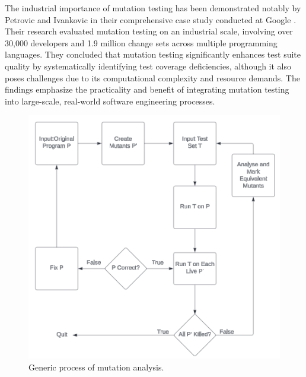 The industrial importance of mutation testing has been demonstrated notably by Petrovic and Ivankovic in their comprehensive case study conducted at Google \cite{petrovic2018industrial}. Their research evaluated mutation testing on an industrial scale, involving over 30,000 developers and 1.9 million change sets across multiple programming languages. They concluded that mutation testing significantly enhances test suite quality by systematically identifying test coverage deficiencies, although it also poses challenges due to its computational complexity and resource demands. The findings emphasize the practicality and benefit of integrating mutation testing into large-scale, real-world software engineering processes.

\begin{figure}[!htbp]
    \centering
    \includegraphics[width=\linewidth]{images/MutationProcess.png}
    \caption{Generic process of mutation analysis.~\cite{offutt2010mutation}}
    \label{fig:MutationAnalysis}
\end{figure}

